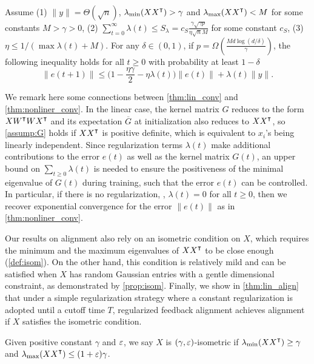 \begin{theorem}
\label{thm:lin_conv}
Assume \textnormal{(1)}  $\|y\| = \Theta(\sqrt n)$, $\lambda_{\min}(XX\transpose)>\gamma$ and $\lambda_{\max}(XX\transpose)<M$ for some constants $M>\gamma>0$, \textnormal{(2)} $\sum_{t=0}^\infty \lambda(t) \leq  S_\lambda = c_{S}\frac{\gamma\sqrt{\gamma p}}{\eta\sqrt{n}M}$ for some constant $c_{S}$, \textnormal{(3)} $\eta \leq 1/(\max \lambda(t)+M)$.
For any $\delta\in(0,1)$, if $p = \Omega(\frac{Md\log(d/\delta)}{\gamma})$, the following inequality holds for all $t\geq 0$ with probability at least $1-\delta$
\begin{equation}
\label{eq:reg_error_bd}
\|e(t+1)\|\leq \big(1-\frac{\eta\gamma}{2}-\eta\lambda(t)\big)\|e(t)\| + \lambda(t)\|y\|.
\end{equation} 
\end{theorem}

We remark here some connections between \cref{thm:lin_conv} and \cref{thm:nonliner_conv}. In the linear case, the kernel matrix $G$ reduces to the form $X W\transpose W X\transpose$ and its expectation $\overline{G}$ at initialization also reduces to $X X\transpose$, so \cref{assump:G} holds if $XX\transpose$ is positive definite, which is equivalent to $x_i$'s being linearly independent. Since regularization terms $\lambda(t)$ make additional contributions to the error $e(t)$ as well as the kernel matrix $G(t)$, an upper bound on $\sum_{t\geq 0}\lambda(t)$ is needed to ensure the positiveness of the minimal eigenvalue of $G(t)$ during training, such that the error $e(t)$ can be controlled. In particular, if there is no regularization, \ie, $\lambda(t)=0$ for all $t\geq 0$, then we recover exponential convergence for the error $\|e(t)\|$ as in \cref{thm:nonliner_conv}.

Our results on alignment also rely on an isometric condition on $X$, which requires the minimum and the maximum eigenvalues of $XX\transpose$ to be close enough (\cf \cref{def:isom}). On the other hand, this condition is relatively mild and can be satisfied when $X$ has random Gaussian entries with a gentle dimensional constraint, as demonstrated by \cref{prop:isom}. Finally, we show in \cref{thm:lin_align} that under a simple regularization strategy where a constant regularization is adopted until a cutoff time $T$, regularized feedback alignment achieves alignment if $X$ satisfies the isometric condition.
{}
\begin{definition}
\label{def:isom}
Given positive constant $\gamma$ and $\varepsilon$, we say $X$ is $(\gamma, \varepsilon)$-isometric if 
$\lambda_{\min}(XX\transpose)\geq\gamma$ and $\lambda_{\max}(XX\transpose)\leq(1+\eps)\gamma$.
\end{definition}

